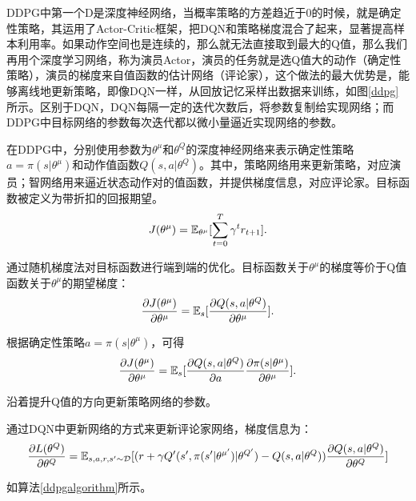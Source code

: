 DDPG中第一个D是深度神经网络，当概率策略的方差趋近于0的时候，就是确定性策略，其运用了Actor-Critic框架，把DQN和策略梯度混合了起来，显著提高样本利用率。如果动作空间也是连续的，那么就无法直接取到最大的Q值，那么我们再用个深度学习网络，称为演员Actor，演员的任务就是选Q值大的动作（确定性策略），演员的梯度来自值函数的估计网络（评论家），这个做法的最大优势是，能够离线地更新策略，即像DQN一样，从回放记忆采样出数据来训练，如图\ref{ddpg}所示。区别于DQN，DQN每隔一定的迭代次数后，将参数复制给实现网络；而DDPG中目标网络的参数每次迭代都以微小量逼近实现网络的参数。

在DDPG中，分别使用参数为$\theta^\mu$和$\theta^Q$的深度神经网络来表示确定性策略$a = \pi(s|\theta^\mu)$和动作值函数$Q(s,a|\theta^Q)$。其中，策略网络用来更新策略，对应演员；智网络用来逼近状态动作对的值函数，并提供梯度信息，对应评论家。目标函数被定义为带折扣的回报期望。
\begin{equation}
J(\theta^\mu) = \Bbb{E}_{\theta^\mu}[\sum_{t=0}^T \gamma^t r_{t+1}].
\end{equation}

通过随机梯度法对目标函数进行端到端的优化。目标函数关于$\theta^\mu$的梯度等价于Q值函数关于$\theta^\mu$的期望梯度：
\begin{equation}
\frac{\partial J(\theta^\mu)} {\partial \theta^\mu} = \Bbb{E}_s[\frac{\partial Q(s, a | \theta^Q)}{\partial \theta^\mu}].
\end{equation}

根据确定性策略$a = \pi(s|\theta^\mu)$，可得
\begin{equation}
\frac{\partial J(\theta^\mu)} {\partial \theta^\mu} = \Bbb{E}_s[\frac{\partial Q(s, a | \theta^Q)}{\partial a}\frac{\partial \pi(s|\theta^\mu)}{\partial \theta^\mu}].
\end{equation}

沿着提升Q值的方向更新策略网络的参数。

通过DQN中更新网络的方式来更新评论家网络，梯度信息为：
\begin{equation}
\frac{\partial L(\theta^Q)} {\partial \theta^Q} = \Bbb{E}_{s,a,r,s' \sim \mathcal{D}} [(r + \gamma Q'(s',\pi(s'|\theta^{\mu'})|\theta^{Q'}) - Q(s,a|\theta^Q)) \frac{\partial Q(s,a|\theta^Q)}{\partial \theta^Q}]
\end{equation}

如算法\ref{ddpgalgorithm}所示。

